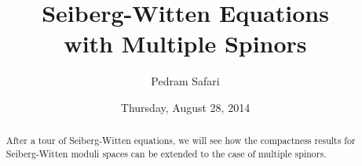 \documentclass{UAmathtalk}
\author{Pedram Safari}
\title{Seiberg-Witten Equations\\ with Multiple Spinors}
\date{Thursday, August 28, 2014}
\begin{document}
\maketitle

\begin{abstract}
After a tour of Seiberg-Witten equations, we will see how the compactness results for Seiberg-Witten moduli spaces can be extended to the case of multiple spinors.
\end{abstract}
\end{document}
